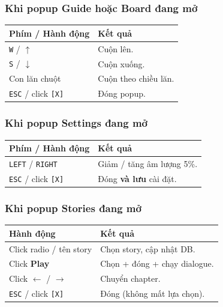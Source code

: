 \documentclass[12pt,a4paper]{article}
\begin{document}
\subsubsection{Khi popup Guide hoặc Board đang mở}
\begin{tabularx}{\linewidth}{|l|X|}
    \hline
    \textbf{Phím / Hành động}          & \textbf{Kết quả} \\
    \hline
    \texttt{W} / \texttt{$\uparrow$}   & Cuộn lên. \\
    \hline
    \texttt{S} / \texttt{$\downarrow$} & Cuộn xuống. \\
    \hline
    Con lăn chuột                      & Cuộn theo chiều lăn. \\
    \hline
    \texttt{ESC} / click \texttt{[X]}  & Đóng popup. \\
    \hline
\end{tabularx}

\subsubsection{Khi popup Settings đang mở}
\begin{tabularx}{\linewidth}{|l|X|}
    \hline
    \textbf{Phím / Hành động}          & \textbf{Kết quả} \\
    \hline
    \texttt{LEFT} / \texttt{RIGHT}     & Giảm / tăng âm lượng 5\%. \\
    \hline
    \texttt{ESC} / click \texttt{[X]}  & Đóng \textbf{và lưu} cài đặt. \\
    \hline
\end{tabularx}

\subsubsection{Khi popup Stories đang mở}
\begin{tabularx}{\linewidth}{|l|X|}
    \hline
    \textbf{Hành động}                        & \textbf{Kết quả} \\
    \hline
    Click radio / tên story                   & Chọn story, cập nhật DB. \\
    \hline
    Click \textbf{Play}                       & Chọn + đóng + chạy dialogue. \\
    \hline
    Click $\leftarrow$ / $\rightarrow$        & Chuyển chapter. \\
    \hline
    \texttt{ESC} / click \texttt{[X]}         & Đóng (không mất lựa chọn). \\
    \hline
\end{tabularx}
\end{document}
